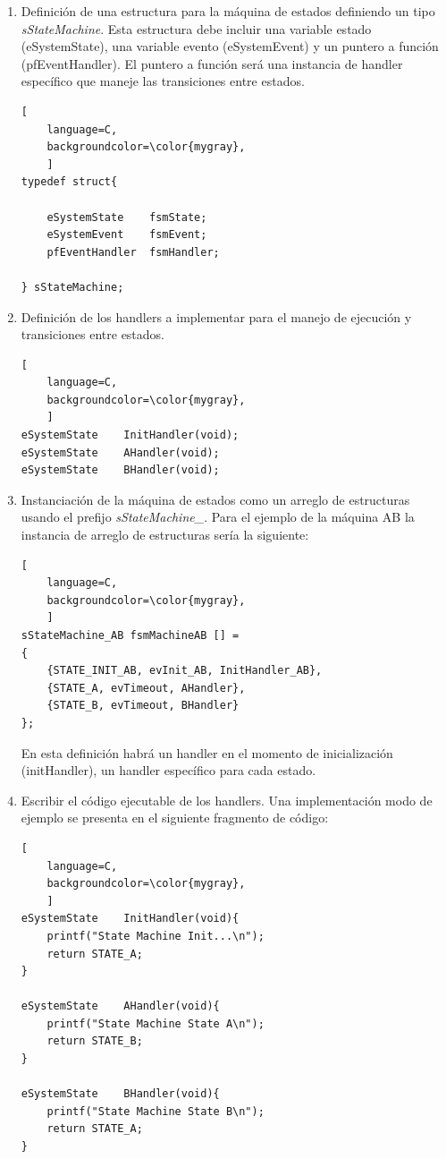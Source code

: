 \begin{enumerate}
\item Definición de una estructura para la máquina de estados definiendo un tipo \textit{sStateMachine}. Esta estructura debe incluir una variable estado (eSystemState), una variable evento (eSystemEvent) y un puntero a función (pfEventHandler). El puntero a función será una instancia de handler específico que maneje las transiciones entre estados. 

\begin{lstlisting}[
	language=C, 
	backgroundcolor=\color{mygray},
	]
typedef struct{

	eSystemState  	fsmState;
	eSystemEvent  	fsmEvent;
	pfEventHandler	fsmHandler;

} sStateMachine;
\end{lstlisting}

\item Definición de los handlers a implementar para el manejo de ejecución y transiciones entre estados.

\begin{lstlisting}[
	language=C, 
	backgroundcolor=\color{mygray},
	]
eSystemState 	InitHandler(void);
eSystemState 	AHandler(void);
eSystemState 	BHandler(void);
\end{lstlisting}

\item Instanciación de la máquina de estados como un arreglo de estructuras usando el prefijo \textit{sStateMachine\_}. Para el ejemplo de la máquina AB la instancia de arreglo de estructuras sería la siguiente:

\begin{lstlisting}[
	language=C, 
	backgroundcolor=\color{mygray},
	]
sStateMachine_AB fsmMachineAB [] = 
{
	{STATE_INIT_AB, evInit_AB, InitHandler_AB},
	{STATE_A, evTimeout, AHandler},
	{STATE_B, evTimeout, BHandler}
};
\end{lstlisting}

En esta definición habrá un handler en el momento de inicialización (initHandler), un handler específico para cada estado.

\item Escribir el código ejecutable de los handlers. Una implementación  modo de ejemplo se presenta en el siguiente fragmento de código:

\begin{lstlisting}[
	language=C, 
	backgroundcolor=\color{mygray},
	]
eSystemState 	InitHandler(void){ 
	printf("State Machine Init...\n");
	return STATE_A; 
}

eSystemState 	AHandler(void){ 
	printf("State Machine State A\n");
	return STATE_B; 
}

eSystemState 	BHandler(void){ 
	printf("State Machine State B\n");
	return STATE_A; 
}
\end{lstlisting}
\end{enumerate}



